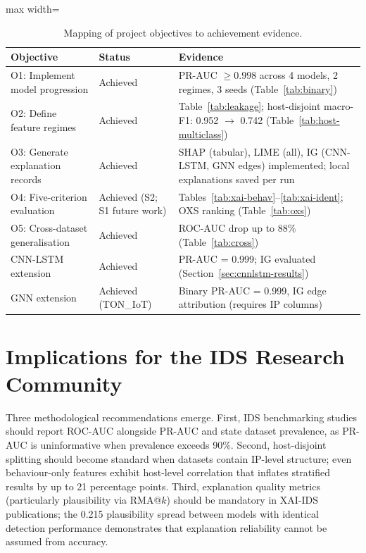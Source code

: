 \documentclass[12pt,a4paper]{report}
\begin{document}
\begin{table}[H]
\centering
\caption{Mapping of project objectives to achievement evidence.}
\label{tab:obj-achievement}
\small
\begin{adjustbox}{max width=\textwidth}
\begin{tabular}{p{}lp{}}
\toprule
\textbf{Objective} & \textbf{Status} & \textbf{Evidence} \\
\midrule
O1: Implement model progression & Achieved & PR-AUC $\geq 0.998$ across 4 models, 2 regimes, 3 seeds (Table~\ref{tab:binary}) \\
\addlinespace
O2: Define feature regimes & Achieved & Table~\ref{tab:leakage}; host-disjoint macro-F1: 0.952 $\to$ 0.742 (Table~\ref{tab:host-multiclass}) \\
\addlinespace
O3: Generate explanation records & Achieved & SHAP (tabular), LIME (all), IG (CNN-LSTM, GNN edges) implemented; local explanations saved per run \\
\addlinespace
O4: Five-criterion evaluation & Achieved (S2; S1 future work) & Tables~\ref{tab:xai-behav}--\ref{tab:xai-ident}; OXS ranking (Table~\ref{tab:oxs}) \\
\addlinespace
O5: Cross-dataset generalisation & Achieved & ROC-AUC drop up to 88\% (Table~\ref{tab:cross}) \\
\addlinespace
CNN-LSTM extension & Achieved & PR-AUC = 0.999; IG evaluated (Section~\ref{sec:cnnlstm-results}) \\
\addlinespace
GNN extension & Achieved (TON\_IoT) & Binary PR-AUC = 0.999, IG edge attribution (requires IP columns) \\
\bottomrule
\end{tabular}
\end{adjustbox}
\end{table}

\section{Implications for the IDS Research Community}
\label{sec:implications}

Three methodological recommendations emerge. First, IDS benchmarking studies should report ROC-AUC alongside PR-AUC and state dataset prevalence, as PR-AUC is uninformative when prevalence exceeds 90\%. Second, host-disjoint splitting should become standard when datasets contain IP-level structure; even behaviour-only features exhibit host-level correlation that inflates stratified results by up to 21 percentage points. Third, explanation quality metrics (particularly plausibility via RMA@$k$) should be mandatory in XAI-IDS publications; the 0.215 plausibility spread between models with identical detection performance demonstrates that explanation reliability cannot be assumed from accuracy.
\end{document}

